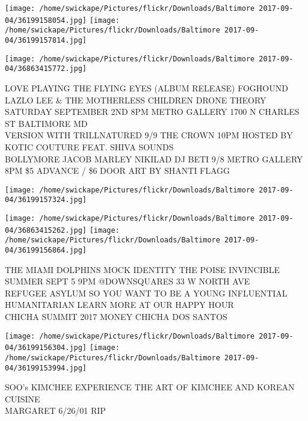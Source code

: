 \documentclass[10pt,letterpaper]{article}
\begin{document}
\texttt{[image: /home/swickape/Pictures/flickr/Downloads/Baltimore 2017-09-04/36199158054.jpg]}
\texttt{[image: /home/swickape/Pictures/flickr/Downloads/Baltimore 2017-09-04/36199157814.jpg]}

\texttt{[image: /home/swickape/Pictures/flickr/Downloads/Baltimore 2017-09-04/36863415772.jpg]}

LOVE PLAYING THE FLYING EYES (ALBUM RELEASE) FOGHOUND LAZLO LEE \& THE MOTHERLESS CHILDREN DRONE THEORY SATURDAY SEPTEMBER 2ND 8PM METRO GALLERY 1700 N CHARLES ST BALTIMORE MD\\
VERSION WITH TRILLNATURED 9/9 THE CROWN 10PM HOSTED BY KOTIC COUTURE FEAT. SHIVA SOUNDS\\
BOLLYMORE JACOB MARLEY NIKILAD DJ BETI 9/8 METRO GALLERY 8PM \$5 ADVANCE / \$6 DOOR ART BY SHANTI FLAGG\\
\pagebreak

\texttt{[image: /home/swickape/Pictures/flickr/Downloads/Baltimore 2017-09-04/36199157324.jpg]}

\vspace{0.25in}
\texttt{[image: /home/swickape/Pictures/flickr/Downloads/Baltimore 2017-09-04/36863415262.jpg]}
\texttt{[image: /home/swickape/Pictures/flickr/Downloads/Baltimore 2017-09-04/36199156864.jpg]}

THE MIAMI DOLPHINS MOCK IDENTITY THE POISE INVINCIBLE SUMMER SEPT 5 9PM @DOWNSQUARES 33 W NORTH AVE\\
REFUGEE ASYLUM SO YOU WANT TO BE A YOUNG INFLUENTIAL HUMANITARIAN LEARN MORE AT OUR HAPPY HOUR\\
CHICHA SUMMIT 2017 MONEY CHICHA DOS SANTOS\\
\pagebreak

\texttt{[image: /home/swickape/Pictures/flickr/Downloads/Baltimore 2017-09-04/36199156304.jpg]}
\texttt{[image: /home/swickape/Pictures/flickr/Downloads/Baltimore 2017-09-04/36199153994.jpg]}

SOO's KIMCHEE EXPERIENCE THE ART OF KIMCHEE AND KOREAN CUISINE\\
MARGARET 6/26/01 RIP\\
\pagebreak
\end{document}
